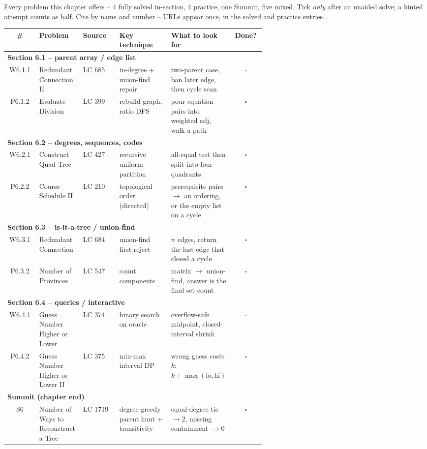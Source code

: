 
Every problem this chapter offers -- 4 fully solved in-section, 4 practice, one Summit, five
mixed. Tick \emph{only} after an unaided solve; a hinted attempt counts as half. Cite by name
and number -- URLs appear once, in the solved and practice entries.

\begin{center}
\footnotesize
\renewcommand{\arraystretch}{1.25}
\begin{tabular}{@{}c p{0.17\linewidth} l p{0.20\linewidth} p{0.24\linewidth} c@{}}
\toprule
\textbf{\#} & \textbf{Problem} & \textbf{Source} & \textbf{Key technique} & \textbf{What to look for} & \textbf{Done?} \\
\midrule
\multicolumn{6}{l}{\textbf{Section 6.1 -- parent array / edge list}} \\
W6.1.1 & Redundant Connection II & LC 685 & \lv4 in-degree + union-find repair & two-parent case, ban later edge, then cycle scan & $\square$ \\
P6.1.2 & Evaluate Division & LC 399 & \lv3 rebuild graph, ratio DFS & pour equation pairs into weighted adj, walk a path & $\square$ \\
\midrule
\multicolumn{6}{l}{\textbf{Section 6.2 -- degrees, sequences, codes}} \\
W6.2.1 & Construct Quad Tree & LC 427 & \lv3 recursive uniform partition & all-equal test then split into four quadrants & $\square$ \\
P6.2.2 & Course Schedule II & LC 210 & \lv3 topological order (directed) & prerequisite pairs $\to$ an ordering, or the empty list on a cycle & $\square$ \\
\midrule
\multicolumn{6}{l}{\textbf{Section 6.3 -- is-it-a-tree / union-find}} \\
W6.3.1 & Redundant Connection & LC 684 & \lv3 union-find first reject & $n$ edges, return the last edge that closed a cycle & $\square$ \\
P6.3.2 & Number of Provinces & LC 547 & \lv2 count components & matrix $\to$ union-find, answer is the final set count & $\square$ \\
\midrule
\multicolumn{6}{l}{\textbf{Section 6.4 -- queries / interactive}} \\
W6.4.1 & Guess Number Higher or Lower & LC 374 & \lv2 binary search on oracle & overflow-safe midpoint, closed-interval shrink & $\square$ \\
P6.4.2 & Guess Number Higher or Lower II & LC 375 & \lv4 min-max interval DP & wrong guess costs $k$: $k+\max(\text{lo},\text{hi})$ & $\square$ \\
\midrule
\multicolumn{6}{l}{\textbf{Summit (chapter end)}} \\
S6 & Number of Ways to Reconstruct a Tree & LC 1719 & \lv5 degree-greedy parent hunt + transitivity & equal-degree tie $\to 2$, missing containment $\to 0$ & $\square$ \\
\bottomrule
\end{tabular}
\end{center}

